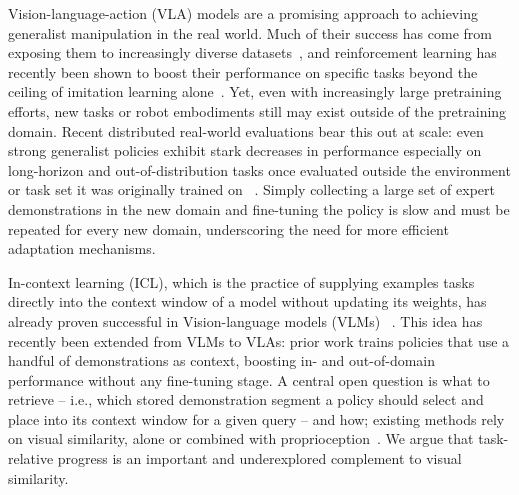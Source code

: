 \documentclass[conference]{IEEEtran}
\begin{document}

Vision-language-action (VLA) models are a promising 
approach to achieving generalist manipulation in the real world.
Much of their success has come from exposing them to increasingly diverse
datasets~\cite{pi05,pi06}, and reinforcement learning has recently been shown
to boost their performance on specific tasks beyond the ceiling of imitation
learning alone~\cite{pi06}. 
Yet, even with increasingly large pretraining efforts, new tasks or robot embodiments still may exist outside of the pretraining domain.
Recent distributed real-world evaluations bear this
out at scale: even strong generalist policies exhibit stark decreases in performance especially on long-horizon and out-of-distribution tasks once evaluated outside the environment or task set it was originally trained on ~\cite{roboarena}.
Simply collecting a large set of expert demonstrations in the new domain and fine-tuning the policy is slow and must be repeated for every new domain, underscoring the need for more efficient adaptation mechanisms.



In-context learning (ICL), which is the practice of supplying examples tasks directly into the context window of a model without updating its weights, has
already proven successful in Vision-language models (VLMs) ~\cite{flamingo}.
This idea has recently been extended from VLMs to VLAs: prior work trains policies that
use a handful of demonstrations as context, boosting in- and out-of-domain
performance without any fine-tuning stage. A central open question is what
to retrieve -- i.e., which stored demonstration segment a policy should
select and place into its context window for a given query -- and how;
existing methods rely on visual similarity, alone or combined with
proprioception~\cite{ricl,mimicdroid}. We argue that task-relative progress
is an important and underexplored complement to visual similarity.
\end{document}
